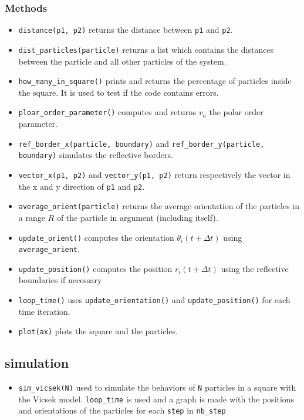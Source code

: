 \documentclass{article}
\begin{document}
\subsubsection*{Methods}
\begin{itemize}
    \item \texttt{distance(p1, p2)} returns the distance between \texttt{p1} and \texttt{p2}.
    \item \texttt{dist\_particles(particle)} returns a list which contains the distances between the particle and all other particles of the system.
    \item \texttt{how\_many\_in\_square()} prints and returns the percentage of particles inside the square. It is
    used to test if the code contains errors.
    \item \texttt{ploar\_order\_parameter()} computes and returns $v_a$ the polar order parameter.
    \item \texttt{ref\_border\_x(particle, boundary)} and \texttt{ref\_border\_y(particle, boundary)}
    simulates the reflective borders.
    \item \texttt{vector\_x(p1, p2)} and \texttt{vector\_y(p1, p2)} return respectively the vector in the x and y direction of \texttt{p1} and \texttt{p2}.
    \item \texttt{average\_orient(particle)} returns the average orientation of the particles in a range $R$ of the particle in argument (including itself).
    \item \texttt{update\_orient()} computes the orientation $\theta_i(t + \Delta t)$ using \texttt{average\_orient}.
    \item \texttt{update\_position()} computes the position $r_i(t + \Delta t)$ using the reflective boundaries if necessary
    \item \texttt{loop\_time()} uses \texttt{update\_orientation()} and \texttt{update\_position()} for each time iteration.
    \item \texttt{plot(ax)} plots the square and the particles.
\end{itemize}

\subsection{simulation}
\begin{itemize}
   \item \texttt{sim\_vicsek(N)} used to simulate the behaviors of \texttt{N} particles in a square with the Vicsek model. \texttt{loop\_time} is 
   used and a graph is made with
   the positions and orientations of the particles for each \texttt{step} in \texttt{nb\_step}
\end{itemize}
\end{document}
